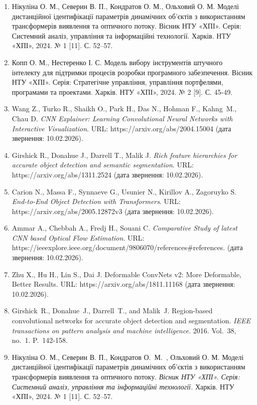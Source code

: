 \documentclass[
]{article}
\begin{document}
\begin{enumerate}
\item
  Нікуліна О. М., Северин В. П., Кондратов О. М., Ольховий О. М. Моделі дистанційної ідентифікації параметрів динамічних об'єктів з використанням трансформерів виявлення та оптичного потоку. Вісник НТУ «ХПІ». Серія: Системний аналіз, управління та інформаційні технології. Харків. НТУ «ХПІ», 2024. № 1 {[}11{]}. С. 52--57.
\item
  Копп О. М., Нестеренко І. С. Модель вибору інструментів штучного інтелекту для підтримки процесів розробки програмного забезпечення. Вісник НТУ «ХПІ». Серія: Стратегічне управління, управління портфелями, програмами та проектами. Харків. НТУ «ХПІ», 2024. № 2 {[}9{]}. С. 45-49.
\item
  Wang Z., Turko R., Shaikh O., Park H., Das N., Hohman F., Kahng~M., Chau D. \emph{CNN Explainer: Learning Convolutional Neural Networks with Interactive Visualization}. URL: https://arxiv.org/abs/2004.15004 (дата звернення: 10.02.2026).
\item
  Girshick R., Donahue J., Darrell T., Malik J. \emph{Rich feature hierarchies for accurate object detection and semantic segmentation}. URL: https://arxiv.org/abs/1311.2524 (дата звернення: 10.02.2026).
\item
  Carion N., Massa F., Synnaeve G., Usunier N., Kirillov A., Zagoruyko S. \emph{End-to-End Object Detection with Transformers}. URL: https://arxiv.org/abs/2005.12872v3 (дата звернення: 10.02.2026).
\item
  Ammar A., Chebbah A., Fredj H., Souani C. \emph{Comparative Study of latest CNN based Optical Flow Estimation}. URL: https://ieeexplore.ieee.org/document/9806070/references\#references. (дата звернення: 10.02.2026).
\item
  \protect{}\label{_Ref221573302}{}Zhu X., Hu H., Lin S., Dai J. Deformable ConvNets v2: More Deformable, Better Results. URL: https://arxiv.org/abs/1811.11168 (дата звернення: 10.02.2026).
\item
  Girshick~R., Donahue~J., Darrell~T., and Malik~J. Region-based convolutional networks for accurate object detection and segmentation. \emph{IEEE transactions on pattern analysis and machine intelligence.} 2016. Vol.~38, no.~1. P.~142-158.
\item
  Нікуліна О. М., Северин В. П., Кондратов О.~М.~, Ольховий О. М. Моделі дистанційної ідентифікації параметрів динамічних об'єктів з використанням трансформерів виявлення та оптичного потоку. \emph{Вісник НТУ «ХПІ». Серія: Системний аналіз, управління та інформаційні технології.} Харків. НТУ «ХПІ», 2024. № 1 {[}11{]}. С. 52--57.

\end{enumerate}
\end{document}

